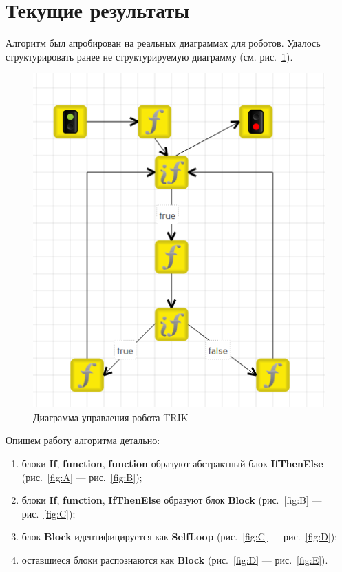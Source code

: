 \documentclass[14pt]{matmex-diploma}
\begin{document}
\section*{Текущие результаты}
Алгоритм был апробирован на реальных диаграммах для роботов. Удалось структурировать
ранее не структурируемую диаграмму (см. рис.~\ref{diagram}).

\begin{figure}[H]
\centering
\includegraphics[scale=0.6]{images/diagram1.png}
\caption{Диаграмма управления робота TRIK}
\label{diagram}
\end{figure}

Опишем работу алгоритма детально:
\begin{enumerate}
    \item блоки \textbf{If}, \textbf{function}, \textbf{function}
          образуют абстрактный блок \textbf{IfThenElse} 
          (рис.~\ref{fig:A} --- рис.~\ref{fig:B});
    \item блоки \textbf{If}, \textbf{function}, \textbf{IfThenElse} 
          образуют блок \textbf{Block}
          (рис.~\ref{fig:B} --- рис.~\ref{fig:C});
    \item блок \textbf{Block} идентифицируется как \textbf{SelfLoop}
          (рис.~\ref{fig:C} --- рис.~\ref{fig:D});
    \item оставшиеся блоки распознаются как \textbf{Block}
          (рис.~\ref{fig:D} --- рис.~\ref{fig:E}).
\end{enumerate}
\end{document}
